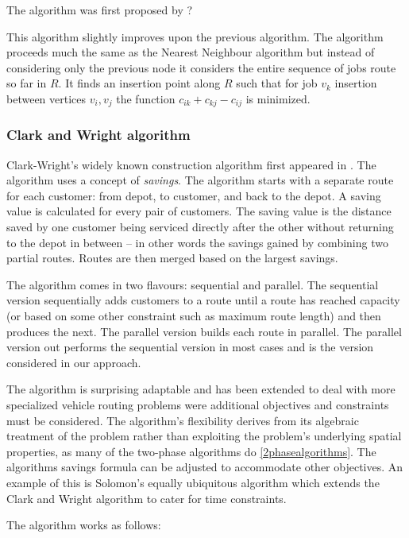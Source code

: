 The algorithm was first proposed by ?

This algorithm slightly improves upon the previous algorithm. The algorithm proceeds much the same as the Nearest Neighbour algorithm but instead of considering only the previous node it considers the entire sequence of jobs route so far in $R$. It finds an insertion point along $R$ such that for job $v_k$ insertion between vertices $v_i, v_j$ the function $c_{ik} + c_{kj} - c_{ij}$ is minimized.

\subsubsection{Clark and Wright algorithm}

Clark-Wright's widely known construction algorithm first appeared in \cite{clark:1964}. The algorithm uses a concept of \emph{savings}. The algorithm starts with a separate route for each customer: from depot, to customer, and back to the depot. A saving value is calculated for every pair of customers. The saving value is the distance saved by one customer being serviced directly after the other without returning to the depot in between -- in other words the savings gained by combining two partial routes. Routes are then merged based on the largest savings.

The algorithm comes in two flavours: sequential and parallel. The sequential version sequentially adds customers to a route until a route has reached capacity (or based on some other constraint such as maximum route length) and then produces the next. The parallel version builds each route in parallel. The parallel version out performs the sequential version in most cases\cite{Laporte:1999} and is the version considered in our approach.

The algorithm is surprising adaptable and has been extended to deal with more specialized vehicle routing problems were additional objectives and constraints must be considered. The algorithm's flexibility derives from its algebraic treatment of the problem rather than exploiting the problem's underlying spatial properties, as many of the two-phase algorithms do \ref{2phasealgorithms}. The algorithms savings formula can be adjusted to accommodate other objectives. An example of this is Solomon's equally ubiquitous algorithm \cite{Solomon:1987} which extends the Clark and Wright algorithm to cater for time constraints. 

The algorithm works as follows:

